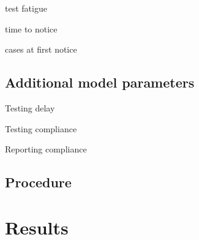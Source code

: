 \documentclass[fleqn,10pt]{SelfArx} %
\begin{document}
test fatigue

time to notice

cases at first notice

\subsection{Additional model parameters}

Testing delay

Testing compliance

Reporting compliance

\subsection{Procedure}

\section{Results}
\label{sec:prelimresults}




\end{document}
